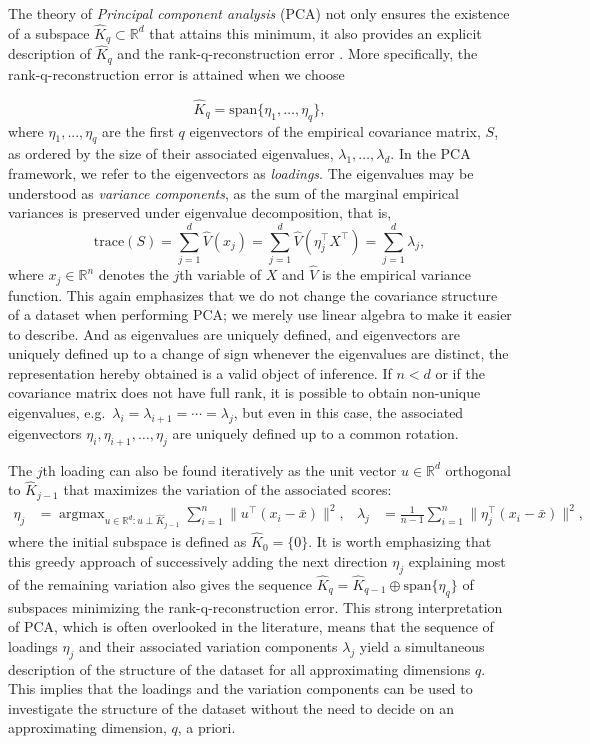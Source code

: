 \documentclass[a4paper,14pt]{article}
\newcommand{\RR}{\mathbb{R}}
\DeclareMathOperator*{\argmax}{argmax}
\begin{document}
The theory of \emph{Principal component analysis} (PCA) not only ensures the existence of a subspace $\hat{K}_q \subset \RR^d$ that attains this minimum, it also provides an explicit description of $\hat{K}_q$ and the rank-q-reconstruction error \cite{HastieEtAl2009}. More specifically, the rank-q-reconstruction error is attained when we choose

\begin{equation*}
\hat{K}_q = \text{span}\{\eta_1,\dotsc,\eta_q\},
\end{equation*}
where $\eta_1, ..., \eta_q$ are the first $q$ eigenvectors of the empirical covariance matrix, $S$, as ordered by the size of their associated eigenvalues, $\lambda_1, \dotsc, \lambda_d$. In the PCA framework, we refer to the eigenvectors as \textit{loadings}. The eigenvalues may be understood as \textit{variance components}, as the sum of the marginal empirical variances is preserved under eigenvalue decomposition, that is,
\begin{equation*}
\text{trace}(S) = \sum_{j=1}^d \hat{V}(x_j) = \sum_{j=1}^d \hat{V}(\eta_j^\top X^\top) = \sum_{j=1}^d \lambda_j,
\end{equation*}
where $x_j \in \RR^n$ denotes the $j$th variable of $X$ and $\hat{V}$ is the empirical variance function. This again emphasizes that we do not change the covariance structure of a dataset when performing PCA; we merely use linear algebra to make it easier to describe. And as eigenvalues are uniquely defined, and eigenvectors are uniquely defined up to a change of sign whenever the eigenvalues are %
distinct, the representation hereby obtained is a valid object of inference. If $n < d$ or if the covariance matrix does not have full rank, it is possible to obtain non-unique eigenvalues, e.g.\ $\lambda_i=\lambda_{i+1}=\dotsm=\lambda_j$, but even in this case, the associated eigenvectors $\eta_i,\eta_{i+1},\dotsc,\eta_j$ are uniquely defined up to a common rotation.

The $j$th loading can also be found iteratively as the unit vector $u \in \RR^d$ orthogonal to $\hat{K}_{j-1}$ that maximizes the variation of the associated scores:
\begin{align*}
\eta_j &= \argmax_{u \in \RR^d\colon u \perp \hat{K}_{j-1}} \sum_{i=1}^n \lVert u^\top (x_i - \bar{x}) \rVert^2, &
\lambda_j &= \frac{1}{n-1} \sum_{i=1}^n \lVert \eta_j^\top (x_i - \bar{x}) \rVert^2,
\end{align*}
where the initial subspace is defined as $\hat{K}_0 = \{0\}$. It is worth emphasizing that this greedy approach of successively adding the next direction $\eta_j$ explaining most of the remaining variation also gives the sequence $\hat{K}_q = \hat{K}_{q-1} \oplus \text{span} \{\eta_q\}$ of subspaces minimizing the rank-q-reconstruction error. This strong interpretation of PCA, which is often overlooked in the literature, means that the sequence of loadings $\eta_j$ and their associated variation components $\lambda_j$ yield a simultaneous description of the structure of the dataset for all approximating dimensions $q$. This implies that the loadings and the variation components can be used to investigate the structure of the dataset without the need to decide on an approximating dimension, $q$, a priori.
\end{document}
